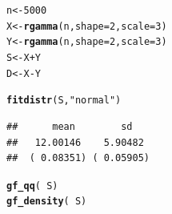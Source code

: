 \documentclass[twoside]{book}\usepackage[]{graphicx}\usepackage[]{xcolor}
\makeatletter
\newcommand{\hlnum}[1]{\textcolor[rgb]{0.686,0.059,0.569}{#1}}%
\newcommand{\hlstr}[1]{\textcolor[rgb]{0.192,0.494,0.8}{#1}}%
\newcommand{\hlopt}[1]{\textcolor[rgb]{0,0,0}{#1}}%
\newcommand{\hlstd}[1]{\textcolor[rgb]{0.345,0.345,0.345}{#1}}%
\newcommand{\hlkwb}[1]{\textcolor[rgb]{0.69,0.353,0.396}{#1}}%
\newcommand{\hlkwc}[1]{\textcolor[rgb]{0.333,0.667,0.333}{#1}}%
\newcommand{\hlkwd}[1]{\textcolor[rgb]{0.737,0.353,0.396}{\textbf{#1}}}%
\newenvironment{kframe}{%
 \def\at@end@of@kframe{}%
 \ifinner\ifhmode%
  \def\at@end@of@kframe{\end{minipage}}%
  \begin{minipage}{\columnwidth}%
 \fi\fi%
 \def\FrameCommand##1{\hskip\@totalleftmargin \hskip-\fboxsep
 \colorbox{shadecolor}{##1}\hskip-\fboxsep
     \hskip-\linewidth \hskip-\@totalleftmargin \hskip\columnwidth}%
 \MakeFramed {\advance\hsize-\width
   \@totalleftmargin\z@ \linewidth\hsize
   \@setminipage}}%
 {\par\unskip\endMakeFramed%
 \at@end@of@kframe}
\newenvironment{knitrout}{}{} %
\makeatother
\begin{document}
\begin{solution}
\begin{knitrout}
\color{fgcolor}\begin{kframe}
\begin{alltt}
\hlstd{n} \hlkwb{<-} \hlnum{5000}
\hlstd{X} \hlkwb{<-} \hlkwd{rgamma}\hlstd{(n,}  \hlkwc{shape} \hlstd{=} \hlnum{2}\hlstd{,} \hlkwc{scale} \hlstd{=} \hlnum{3}\hlstd{)}
\hlstd{Y} \hlkwb{<-} \hlkwd{rgamma}\hlstd{(n,}  \hlkwc{shape} \hlstd{=} \hlnum{2}\hlstd{,} \hlkwc{scale} \hlstd{=} \hlnum{3}\hlstd{)}
\hlstd{S} \hlkwb{<-} \hlstd{X} \hlopt{+} \hlstd{Y}
\hlstd{D} \hlkwb{<-} \hlstd{X} \hlopt{-} \hlstd{Y}
\end{alltt}
\end{kframe}
\end{knitrout}
\begin{knitrout}
\color{fgcolor}\begin{kframe}
\begin{alltt}
\hlkwd{fitdistr}\hlstd{(S,} \hlstr{"normal"}\hlstd{)}
\end{alltt}
\begin{verbatim}
##      mean        sd   
##   12.00146    5.90482 
##  ( 0.08351) ( 0.05905)
\end{verbatim}
\begin{alltt}
\hlkwd{gf_qq}\hlstd{(} \hlopt{~} \hlstd{S)}
\hlkwd{gf_density}\hlstd{(} \hlopt{~} \hlstd{S)}
\end{alltt}
\end{kframe}


\end{knitrout}
\end{solution}
\end{document}
